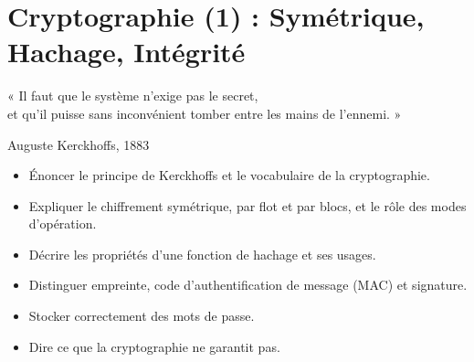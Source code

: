 
\chapter{Cryptographie (1) : Symétrique, Hachage, Intégrité}
\label{chap:crypto-sym}

\epigraph{%
    « Il faut que le système n'exige pas le secret,\\
    et qu'il puisse sans inconvénient tomber entre les mains de l'ennemi. »%
}{Auguste Kerckhoffs, 1883}


\begin{boxobjectifs}
\begin{itemize}
    \item Énoncer le principe de Kerckhoffs et le vocabulaire de la
          cryptographie.
    \item Expliquer le chiffrement symétrique, par flot et par blocs, et le
          rôle des modes d'opération.
    \item Décrire les propriétés d'une fonction de hachage et ses usages.
    \item Distinguer empreinte, code d'authentification de message (MAC) et
          signature.
    \item Stocker correctement des mots de passe.
    \item Dire ce que la cryptographie ne garantit pas.
\end{itemize}
\end{boxobjectifs}

\bigskip

